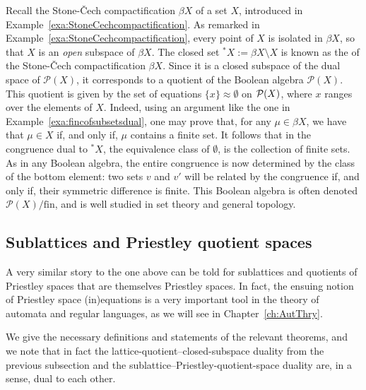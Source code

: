\begin{example} \label{exa:remainderofbetaX}
Recall the Stone-{\v C}ech compactification $\beta X$ of a set $X$, introduced in  Example~\ref{exa:StoneCechcompactification}. As remarked in Example~\ref{exa:StoneCechcompactification}, every point of $X$ is isolated in $\beta X$, so that $X$ is an \emph{open} subspace of $\beta X$. The closed set ${}^*X := \beta X\setminus X$ is known as the  of the Stone-{\v C}ech compactification $\beta X$. Since it is a closed subspace of the dual space of $\mathcal{P}(X)$, it corresponds to a quotient of the Boolean algebra $\mathcal{P}(X)$. 
This quotient is given by the set of equations $\{x\} \approx \emptyset$ on $\mathcal{P}(X)$, where $x$ ranges over the elements of $X$.
Indeed, using an argument like the one in Example~\ref{exa:fincofsubsetsdual}, one may prove that, for any $\mu \in \beta X$, we have that $\mu \in X$ if, and only if, $\mu$ contains a finite set. It follows that in the congruence dual to ${}^*X$, the equivalence class of $\emptyset$, is the collection of finite sets. As in any Boolean algebra, the entire congruence is now determined by the class of the bottom element: two sets $v$ and $v'$ will be related by the congruence if, and only if, their symmetric difference is finite.
This Boolean algebra is often denoted $\mathcal{P}(X)/\mathrm{fin}$, and is well studied in set theory and general topology.
\end{example}

\subsection*{Sublattices and Priestley quotient spaces}
A very similar story to the one above can be told for sublattices and quotients of Priestley spaces that are themselves Priestley spaces. In fact, the ensuing notion of Priestley space (in)equations is a very important tool in the theory of automata and regular languages, as we will see in Chapter~\ref{ch:AutThry}.

We give the necessary definitions and statements of the relevant theorems, and we note that in fact the lattice-quotient--closed-subspace duality from the previous subsection and the sublattice--Priestley-quotient-space duality are, in a sense, dual to each other.

